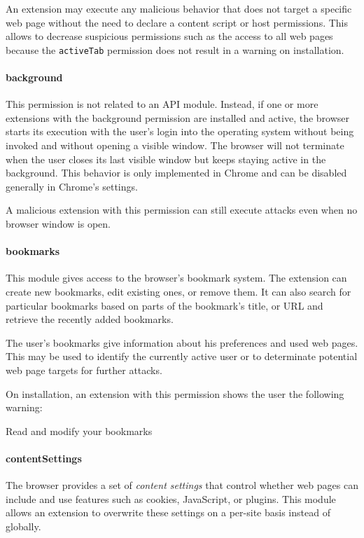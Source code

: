 	An extension may execute any malicious behavior that does not target a specific web page without the need to declare a content script or host permissions. This allows to decrease suspicious permissions such as the access to all web pages because the \texttt{activeTab} permission does not result in a warning on installation.

\paragraph{background}
	This permission is not related to an API module. Instead, if one or more extensions with the background permission are installed and active, the browser starts its execution with the user's login into the operating system without being invoked and without opening a visible window. The browser will not terminate when the user closes its last visible window but keeps staying active in the background. This behavior is only implemented in Chrome and can be disabled generally in Chrome's settings.
	
	A malicious extension with this permission can still execute attacks even when no browser window is open.
	
\paragraph{bookmarks} 
	This module gives access to the browser's bookmark system. The extension can create new bookmarks, edit existing ones, or remove them. It can also search for particular bookmarks based on parts of the bookmark's title, or URL and retrieve the recently added bookmarks.
	
	The user's bookmarks give information about his preferences and used web pages. This may be used to identify the currently active user or to determinate potential web page targets for further attacks.
	
	On installation, an extension with this permission shows the user the following warning:
	\begin{permissionwarning}
		Read and modify your bookmarks
	\end{permissionwarning}
	
\paragraph{contentSettings} 
	The browser provides a set of \textit{content settings} that control whether web pages can include and use features such as cookies, JavaScript, or plugins. This module  allows an extension to overwrite these settings on a per-site basis instead of globally.
	
